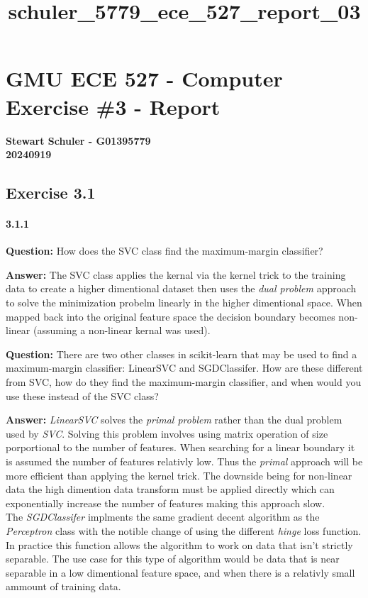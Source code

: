 \documentclass[11pt]{article}
\title{schuler\_5779\_ece\_527\_report\_03}
\begin{document}
    
    \maketitle
    
    

    
    \hypertarget{gmu-ece-527---computer-exercise-3---report}{%
\section{GMU ECE 527 - Computer Exercise \#3 -
Report}\label{gmu-ece-527---computer-exercise-3---report}}

\textbf{Stewart Schuler - G01395779}\\
\textbf{20240919}

    \hypertarget{exercise-3.1}{%
\subsection{Exercise 3.1}\label{exercise-3.1}}

\hypertarget{section}{%
\paragraph{3.1.1}\label{section}}

\textbf{Question:} How does the SVC class find the maximum-margin
classifier?

\textbf{Answer:} The SVC class applies the kernal via the kernel trick
to the training data to create a higher dimentional dataset then uses
the \emph{dual problem} approach to solve the minimization probelm
linearly in the higher dimentional space. When mapped back into the
original feature space the decision boundary becomes non-linear
(assuming a non-linear kernal was used).

\textbf{Question:} There are two other classes in scikit-learn that may
be used to find a maximum-margin classifier: LinearSVC and SGDClassifer.
How are these different from SVC, how do they find the maximum-margin
classifier, and when would you use these instead of the SVC class?

\textbf{Answer:} \emph{LinearSVC} solves the \emph{primal problem}
rather than the dual problem used by \emph{SVC}. Solving this problem
involves using matrix operation of size porportional to the number of
features. When searching for a linear boundary it is assumed the number
of features relativly low. Thus the \emph{primal} approach will be more
efficient than applying the kernel trick. The downside being for
non-linear data the high dimention data transform must be applied
directly which can exponentially increase the number of features making
this approach slow.\\
The \emph{SGDClassifer} implments the same gradient decent algorithm as
the \emph{Perceptron} class with the notible change of using the
different \emph{hinge} loss function. In practice this function allows
the algorithm to work on data that isn't strictly separable. The use
case for this type of algorithm would be data that is near separable in
a low dimentional feature space, and when there is a relativly small
ammount of training data.
\end{document}
